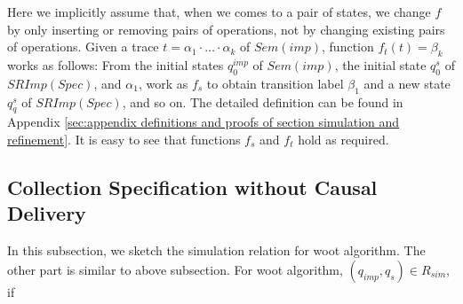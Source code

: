 {Here we implicitly assume that, when we comes to a pair of states, we change $f$ by only inserting or removing pairs of operations, not by changing existing pairs of operations. Given a trace $t = \alpha_1 \cdot \ldots \cdot \alpha_k$ of $\mathit{Sem}(\mathit{imp})$, function $f_t(t) = \beta_k$ works as follows: From the initial states $q_0^{\mathit{imp}}$ of $\mathit{Sem}(\mathit{imp})$, the initial state $q_0^{s}$ of $\mathit{SRImp}(\mathit{Spec})$, and $\alpha_1$, work as $f_s$ to obtain transition label $\beta_1$ and a new state $q_q^{s}$ of $\mathit{SRImp}(\mathit{Spec})$, and so on. The detailed definition can be found in Appendix \ref{sec:appendix definitions and proofs of section simulation and refinement}. It is easy to see that functions $f_s$ and $f_t$ hold as required.
}



\subsection{Collection Specification without Causal Delivery}
\label{subsec:collection specification without calusal delivery}

In this subsection, we sketch the simulation relation for woot algorithm. The other part is similar to above subsection. For woot algorithm, $(q_{\mathit{imp}},q_s) \in R_{\mathit{sim}}$, if

